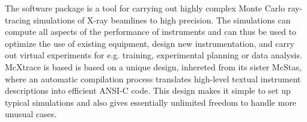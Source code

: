 The software package \MCX is a tool for carrying out highly complex 
Monte Carlo ray-tracing simulations of X-ray beamlines to high precision. 
The simulations can compute all aspects of the
performance of instruments and can thus be used to optimize the use of
existing equipment, design new instrumentation, and carry out virtual
experiments for e.g. training, experimental planning or data analysis. 
McXtrace is based is based on a unique design, inhereted from its sister McStas, 
where an automatic compilation process
translates high-level textual instrument descriptions into efficient
ANSI-C code. This design makes it simple to set up typical simulations
and also gives essentially unlimited freedom to handle more unusual
cases.
